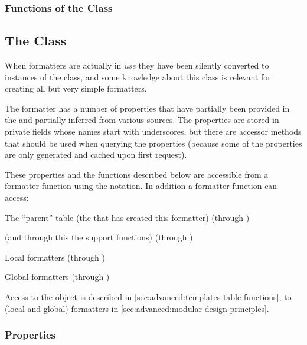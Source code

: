 \documentclass[12pt]{scrartcl}
\begin{document}
\subsubsection{Functions of the  Class}
\label{sec:advanced:templates-table-functions}



\subsection{The  Class}
\label{sec:advanced:the-formatter-class}

When formatters are actually in \emph{use} they have been silently converted to
instances of the  class, and some knowledge about this class
is relevant for creating all but very simple formatters.

The formatter has a number of properties that have partially been provided in
the  and partially inferred from various sources.  The
properties are stored in private fields whose names start with underscores, but
there are accessor methods that should be used when querying the properties
(because some of the properties are only generated and cached upon first
request).

These properties and the functions described below are accessible from a
formatter function using the  notation.  In addition a formatter
function can access:

\begin{itemize*}
\item The “parent” table (the  that has created this formatter)
(through )
\item {} (and through this the support functions) (through
)
\item Local formatters (through )
\item Global formatters (through )
\end{itemize*}

Access to the  object is described in
\vref{sec:advanced:templates-table-functions}, to (local and global) formatters
in \vref{sec:advanced:modular-design-principles}.


\subsubsection{ Properties}
\label{sec:advanced:formatter-properties}
\end{document}
